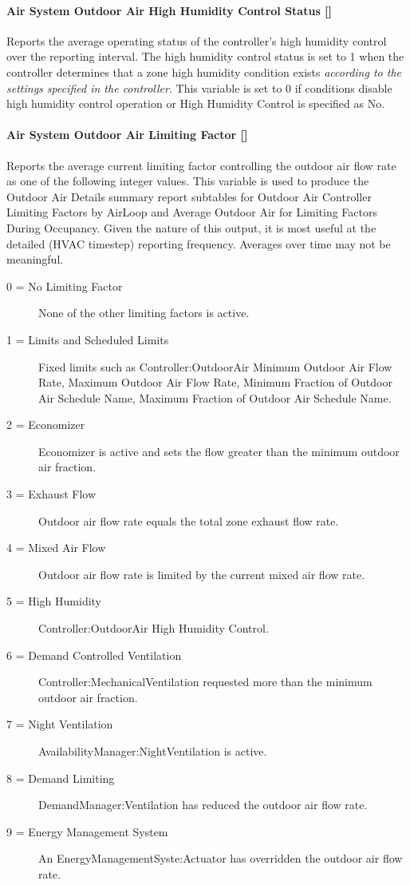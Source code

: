 \paragraph{Air System Outdoor Air High Humidity Control Status {[]}}\label{air-system-outdoor-air-high-humidity-control-status}

Reports the average operating status of the controller's high humidity control over the reporting interval. The high humidity control status is set to 1 when the controller determines that a zone high humidity condition exists \emph{according to the settings specified in the controller}. This variable is set to 0 if conditions disable high humidity control operation or High Humidity Control is specified as No.

\paragraph{Air System Outdoor Air Limiting Factor {[]}}\label{air-system-outdoor-air-limiting-factor}

Reports the average current limiting factor controlling the outdoor air flow rate as one of the following integer values. This variable is used to produce the Outdoor Air Details summary report subtables for Outdoor Air Controller Limiting Factors by AirLoop and Average Outdoor Air for Limiting Factors During Occupancy. Given the nature of this output, it is most useful at the detailed (HVAC timestep) reporting frequency. Averages over time may not be meaningful.
\begin{description}
  \item[0 = No Limiting Factor] None of the other limiting factors is active.
  \item[1 = Limits and Scheduled Limits] Fixed limits such as Controller:OutdoorAir Minimum Outdoor Air Flow Rate, Maximum Outdoor Air Flow Rate, Minimum Fraction of Outdoor Air Schedule Name, Maximum Fraction of Outdoor Air Schedule Name.
  \item[2 = Economizer] Economizer is active and sets the flow greater than the minimum outdoor air fraction.
  \item[3 = Exhaust Flow] Outdoor air flow rate equals the total zone exhaust flow rate.
  \item[4 = Mixed Air Flow] Outdoor air flow rate is limited by the current mixed air flow rate.
  \item[5 = High Humidity] Controller:OutdoorAir High Humidity Control.
  \item[6 = Demand Controlled Ventilation] Controller:MechanicalVentilation requested more than the minimum outdoor air fraction.
  \item[7 = Night Ventilation] AvailabilityManager:NightVentilation is active.
  \item[8 = Demand Limiting] DemandManager:Ventilation has reduced the outdoor air flow rate.
  \item[9 = Energy Management System] An EnergyManagementSyste:Actuator has overridden the outdoor air flow rate.
\end{description}


